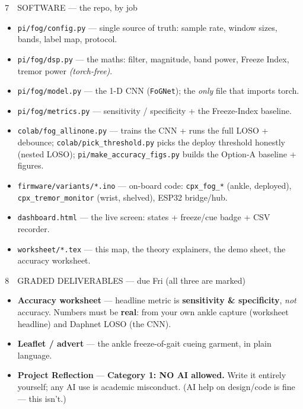 \documentclass[11pt]{article}
\newcommand{\code}[1]{{\footnotesize\color{muted}\texttt{#1}}}
\begin{document}
\vspace{8pt}

\begin{cat}{\,7\ \ SOFTWARE — the repo, by job}
  \begin{itemize}
    \item \code{pi/fog/config.py} — single source of truth: sample rate, window sizes, bands, label map, protocol.
    \item \code{pi/fog/dsp.py} — the maths: filter, magnitude, band power, Freeze Index, tremor power \emph{(torch-free)}.
    \item \code{pi/fog/model.py} — the 1-D CNN (\texttt{FoGNet}); the \emph{only} file that imports torch.
    \item \code{pi/fog/metrics.py} — sensitivity / specificity + the Freeze-Index baseline.
    \item \code{colab/fog\_allinone.py} — trains the CNN + runs the full LOSO + debounce; \code{colab/pick\_threshold.py} picks the deploy threshold honestly (nested LOSO); \code{pi/make\_accuracy\_figs.py} builds the Option-A baseline + figures.
    \item \code{firmware/variants/*.ino} — on-board code: \texttt{cpx\_fog\_*} (ankle, deployed), \texttt{cpx\_tremor\_monitor} (wrist, shelved), ESP32 bridge/hub.
    \item \code{dashboard.html} — the live screen: states + freeze/cue badge + CSV recorder.
    \item \code{worksheet/*.tex} — this map, the theory explainers, the demo sheet, the accuracy worksheet.
  \end{itemize}
\end{cat}

\vspace{8pt}

\begin{cat}[amber]{\,8\ \ GRADED DELIVERABLES — due Fri (all three are marked)}
  \begin{itemize}
    \item \textbf{Accuracy worksheet} — headline metric is \textbf{sensitivity \& specificity},
      \emph{not} accuracy. Numbers must be \textbf{real}: from your own ankle capture (worksheet headline) and Daphnet LOSO (the CNN).
    \item \textbf{Leaflet / advert} — the ankle freeze-of-gait cueing garment, in plain language.
    \item \textbf{Project Reflection} — \textbf{\color{amber}Category 1: NO AI allowed.} Write it
      entirely yourself; any AI use is academic misconduct. (AI help on design/code is fine — this isn't.)
  \end{itemize}
\end{cat}
\end{document}
